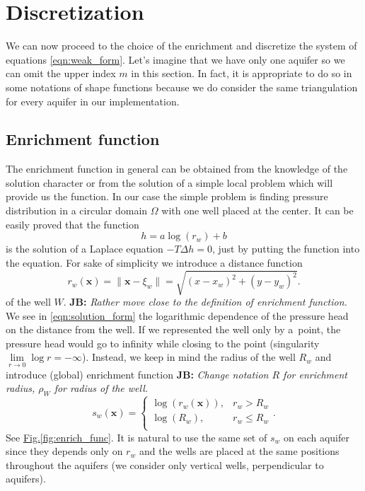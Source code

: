 \documentclass[preprint,12pt]{elsarticle}
\newcommand{\fig}[1]{\hyperref[#1]{Fig.\ref{#1}}}
\def\vc#1{\mathbf{\boldsymbol{#1}}}     %
\newcommand{\bx}{\vc{x}}
\newcommand{\noteJB}[1]{{\color{Blue} \textbf{JB: } \textit{#1}}}
\begin{document}
\section{Discretization}
\label{sec:pum_methods}
We can now proceed to the choice of the enrichment and discretize the system of equations
\eqref{eqn:weak_form}.
Let's imagine that we have only one aquifer so we can omit the upper index $m$ in this section.
In fact, it is appropriate to do so in some notations of shape functions because we do consider the same 
triangulation for every aquifer in our implementation.

\subsection{Enrichment function}
The enrichment function in general can be obtained from the knowledge of the solution character or 
from the solution of a simple local problem which will provide us the function.
In our case the simple problem is finding pressure distribution in a circular domain $\Omega$ with one well 
placed at the center. It can be easily proved that the function
%
\begin{equation} \label{eqn:solution_form}
  h = a \log(r_w)+b
\end{equation}
%
is the solution of a Laplace equation $-T \Delta h = 0$, just by putting the function into the equation. 
For sake of simplicity we introduce a distance function 
\begin{equation*}
      r_w(\bx) = \|\bx - \xi_w\|= \sqrt{(x-x_w)^2+(y-y_w)^2}.
\end{equation*}
of the well $W$.
\noteJB{Rather move close to the definition of enrichment function.}
%
We see in \eqref{eqn:solution_form} the logarithmic dependence of the pressure head on the distance from 
the well. If we represented the well only by a~point, the pressure head would go to infinity while closing 
to the point (singularity $\lim \limits_{r\rightarrow 0} \log r= -\infty$). Instead, we keep in mind the
radius of the well $R_w$ and introduce (global) enrichment function
\noteJB{Change notation $R$ for enrichment radius, $\rho_W$ for radius of the well.}
%
\begin{equation}
\label{eqn:enrich_func}
s_w(\bx) = 
  \begin{cases}
  \log(r_w(\bx)), & r_w > R_w\\
  \log(R_w), & r_w \le R_w\\
  \end{cases}.
\end{equation}
See \fig{fig:enrich_func}.
It is natural to use the same set of $s_w$ on each aquifer since they depends only on $r_w$ and the wells are 
placed at the same positions throughout the aquifers (we consider only vertical wells, perpendicular to aquifers).
%
\end{document}

